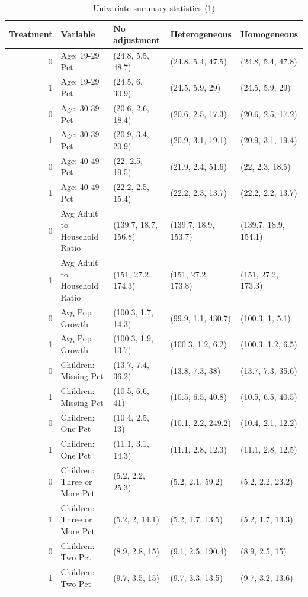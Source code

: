 \begin{table}[ht]
\centering
    \caption{Univariate summary statistics (1)}
    \label{tab:summarytab1}
\begin{tabular}{rllll}
  \hline
Treatment & Variable & No adjustment & Heterogeneous & Homogeneous \\ 
  \hline
0 & Age: 19-29 Pct & (24.8, 5.5, 48.7) & (24.8, 5.4, 47.5) & (24.8, 5.4, 47.8) \\ 
  1 & Age: 19-29 Pct & (24.5, 6, 30.9) & (24.5, 5.9, 29) & (24.5, 5.9, 29) \\ 
  0 & Age: 30-39 Pct & (20.6, 2.6, 18.4) & (20.6, 2.5, 17.3) & (20.6, 2.5, 17.2) \\ 
  1 & Age: 30-39 Pct & (20.9, 3.4, 20.9) & (20.9, 3.1, 19.1) & (20.9, 3.1, 19.4) \\ 
  0 & Age: 40-49 Pct & (22, 2.5, 19.5) & (21.9, 2.4, 51.6) & (22, 2.3, 18.5) \\ 
  1 & Age: 40-49 Pct & (22.2, 2.5, 15.4) & (22.2, 2.3, 13.7) & (22.2, 2.2, 13.7) \\ 
  0 & Avg Adult to Household Ratio & (139.7, 18.7, 156.8) & (139.7, 18.9, 153.7) & (139.7, 18.9, 154.1) \\ 
  1 & Avg Adult to Household Ratio & (151, 27.2, 174.3) & (151, 27.2, 173.8) & (151, 27.2, 173.3) \\ 
  0 & Avg Pop Growth & (100.3, 1.7, 14.3) & (99.9, 1.1, 430.7) & (100.3, 1, 5.1) \\ 
  1 & Avg Pop Growth & (100.3, 1.9, 13.7) & (100.3, 1.2, 6.2) & (100.3, 1.2, 6.5) \\ 
  0 & Children: Missing Pct & (13.7, 7.4, 36.2) & (13.8, 7.3, 38) & (13.7, 7.3, 35.6) \\ 
  1 & Children: Missing Pct & (10.5, 6.6, 41) & (10.5, 6.5, 40.8) & (10.5, 6.5, 40.5) \\ 
  0 & Children: One Pct & (10.4, 2.5, 13) & (10.1, 2.2, 249.2) & (10.4, 2.1, 12.2) \\ 
  1 & Children: One Pct & (11.1, 3.1, 14.3) & (11.1, 2.8, 12.3) & (11.1, 2.8, 12.5) \\ 
  0 & Children: Three or More Pct & (5.2, 2.2, 25.3) & (5.2, 2.1, 59.2) & (5.2, 2.2, 23.2) \\ 
  1 & Children: Three or More Pct & (5.2, 2, 14.1) & (5.2, 1.7, 13.5) & (5.2, 1.7, 13.3) \\ 
  0 & Children: Two Pct & (8.9, 2.8, 15) & (9.1, 2.5, 190.4) & (8.9, 2.5, 15) \\ 
  1 & Children: Two Pct & (9.7, 3.5, 15) & (9.7, 3.3, 13.5) & (9.7, 3.2, 13.6) \\ 

\end{tabular}
\end{table}
